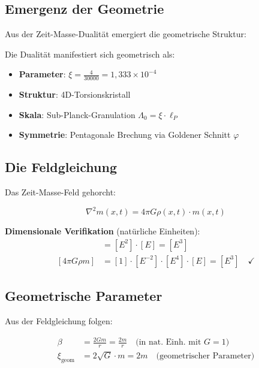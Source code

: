 \subsection{Emergenz der Geometrie}

Aus der Zeit-Masse-Dualität emergiert die geometrische Struktur:

\begin{keyresult}
Die Dualität manifestiert sich geometrisch als:

\begin{itemize}
\item \textbf{Parameter}: $\xi = \frac{4}{30000} = 1{,}333 \times 10^{-4}$
\item \textbf{Struktur}: 4D-Torsionskristall
\item \textbf{Skala}: Sub-Planck-Granulation $\Lambda_0 = \xi \cdot \ell_P$
\item \textbf{Symmetrie}: Pentagonale Brechung via Goldener Schnitt $\varphi$
\end{itemize}
\end{keyresult}

\subsection{Die Feldgleichung}

Das Zeit-Masse-Feld gehorcht:

\begin{equation}
\boxed{\nabla^2 m(x,t) = 4\pi G \rho(x,t) \cdot m(x,t)}
\end{equation}

\textbf{Dimensionale Verifikation} (natürliche Einheiten):
\begin{align}
[\nabla^2 m] &= [E^2] \cdot [E] = [E^3] \\
[4\pi G \rho m] &= [1] \cdot [E^{-2}] \cdot [E^4] \cdot [E] = [E^3] \quad \checkmark
\end{align}

\subsection{Geometrische Parameter}

Aus der Feldgleichung folgen:

\begin{align}
\beta &= \frac{2Gm}{r} = \frac{2m}{r} \quad \text{(in nat. Einh. mit } G=1\text{)} \\
\xi_{\text{geom}} &= 2\sqrt{G} \cdot m = 2m \quad \text{(geometrischer Parameter)}
\end{align}

